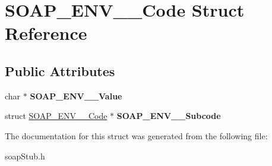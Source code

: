 \hypertarget{structSOAP__ENV____Code}{
\section{SOAP\_\-ENV\_\-\_\-Code Struct Reference}
\label{structSOAP__ENV____Code}
}
\subsection*{Public Attributes}
\begin{DoxyCompactItemize}
\item 
\hypertarget{structSOAP__ENV____Code_ad4f98507b4108e305613e7621f18949c}{
char $\ast$ {\bfseries SOAP\_\-ENV\_\-\_\-Value}}
\label{structSOAP__ENV____Code_ad4f98507b4108e305613e7621f18949c}

\item 
\hypertarget{structSOAP__ENV____Code_a2d44ac860b79956cff26131fa68b4c5a}{
struct \hyperlink{structSOAP__ENV____Code}{SOAP\_\-ENV\_\-\_\-Code} $\ast$ {\bfseries SOAP\_\-ENV\_\-\_\-Subcode}}
\label{structSOAP__ENV____Code_a2d44ac860b79956cff26131fa68b4c5a}

\end{DoxyCompactItemize}


The documentation for this struct was generated from the following file:\begin{DoxyCompactItemize}
\item 
soapStub.h\end{DoxyCompactItemize}
